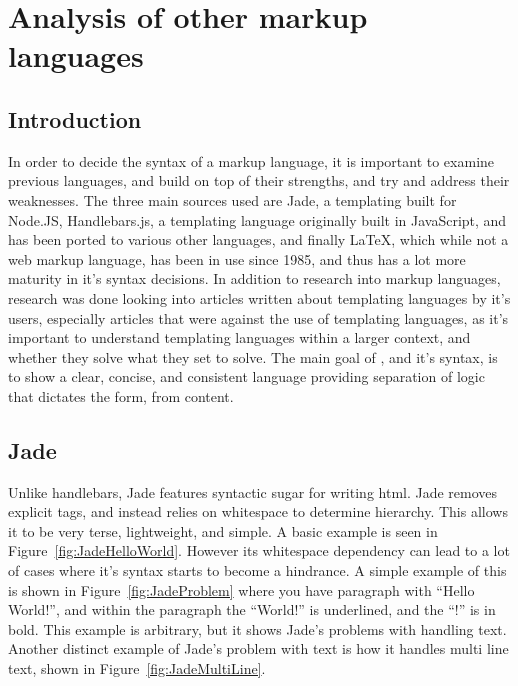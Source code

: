 \section{Analysis of other markup languages}

\subsection{Introduction}

In order to decide the syntax of a  markup language, it is important to examine previous languages, and build on top of their strengths, and try and address their weaknesses. The three main sources used are Jade, a templating built for Node.JS\cite{Jade}, Handlebars.js, a templating language originally built in JavaScript, and has been ported to various other languages, and finally \LaTeX{}, which while not a web markup language, has been in use since 1985\cite{LaTeX}, and thus has a lot more maturity in it's syntax decisions. In addition to research into markup languages, research was done looking into articles written about templating languages by it's users, especially articles that were against the use of templating languages, as it's important to understand templating languages within a larger context, and whether they solve what they set to solve\cite{AgainstTemplating}\cite{LinkedinTemplating}. The main goal of \languageName{}, and it's syntax, is to show a clear, concise, and consistent language providing separation of logic that dictates the form, from content.

\subsection{Jade}

Unlike handlebars, Jade features syntactic sugar for writing html. Jade removes explicit tags, and instead relies on whitespace to determine hierarchy. This allows it to be very terse, lightweight, and simple. A basic example is seen in Figure~\ref{fig:JadeHelloWorld}. However its whitespace dependency can lead to a lot of cases where it's syntax starts to become a hindrance. A simple example of this is shown in Figure~\ref{fig:JadeProblem} where you have paragraph with ``Hello World!'', and within the paragraph the ``World!'' is underlined, and the ``!'' is in bold. This example is arbitrary, but it shows Jade's problems with handling text. Another distinct example of Jade's problem with text is how it handles multi line text, shown in Figure~\ref{fig:JadeMultiLine}. 

